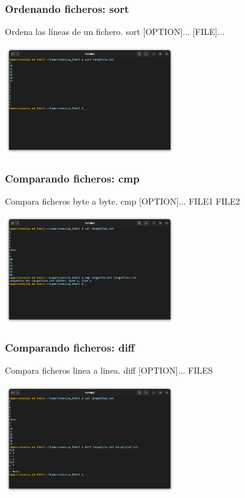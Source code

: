 \documentclass[10pt]{beamer}
\begin{document}
	\begin{frame}
		\frametitle{Ordenando ficheros: sort}
		\begin{alertblock}{Ordena las líneas de un fichero.}
			sort [OPTION]... [FILE]...
		\end{alertblock}
		\begin{center}
			\includegraphics[width=0.55\textwidth]{sort}
		\end{center}
	\end{frame}
		
	\begin{frame}
		\frametitle{Comparando ficheros: cmp}
		\begin{alertblock}{Compara ficheros byte a byte.}
			cmp [OPTION]... FILE1 FILE2
		\end{alertblock}
		\begin{center}
			\includegraphics[width=0.55\textwidth]{cmp}
		\end{center}
	\end{frame}
	
	\begin{frame}
		\frametitle{Comparando ficheros: diff}
		\begin{alertblock}{Compara ficheros linea a linea.}
			diff [OPTION]... FILES
		\end{alertblock}
		\begin{center}
			\includegraphics[width=0.55\textwidth]{diff}
		\end{center}
	\end{frame}
			
\end{document}
